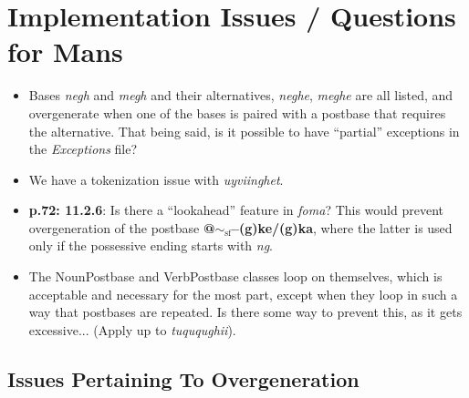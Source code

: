 \documentclass{article}
\begin{document}

\section{Implementation Issues / Questions for Mans}

\begin{itemize}
\renewcommand\labelitemi{$\cdot$}

\item Bases \textit{negh} and \textit{megh} and their alternatives, \textit{neghe}, \textit{meghe} are all listed, and overgenerate when one of the bases is paired with a postbase that requires the alternative.
%
That being said, is it possible to have ``partial'' exceptions in the \textit{Exceptions} file?

\item We have a tokenization issue with \textit{uyviinghet}.

\item \textbf{p.72: 11.2.6}: Is there a ``lookahead'' feature in \textit{foma}?
%
This would prevent overgeneration of the postbase \textbf{@$\sim_\text{sf}$--(g)ke/(g)ka}, where the latter is used only if the possessive ending starts with \textit{ng}.

\item The NounPostbase and VerbPostbase classes loop on themselves, which is acceptable and necessary for the most part, except when they loop in such a way that postbases are repeated.
%
Is there some way to prevent this, as it gets excessive... (Apply up to \textit{tuququghii}).

\end{itemize}

\subsection{Issues Pertaining To Overgeneration}
\end{document}
